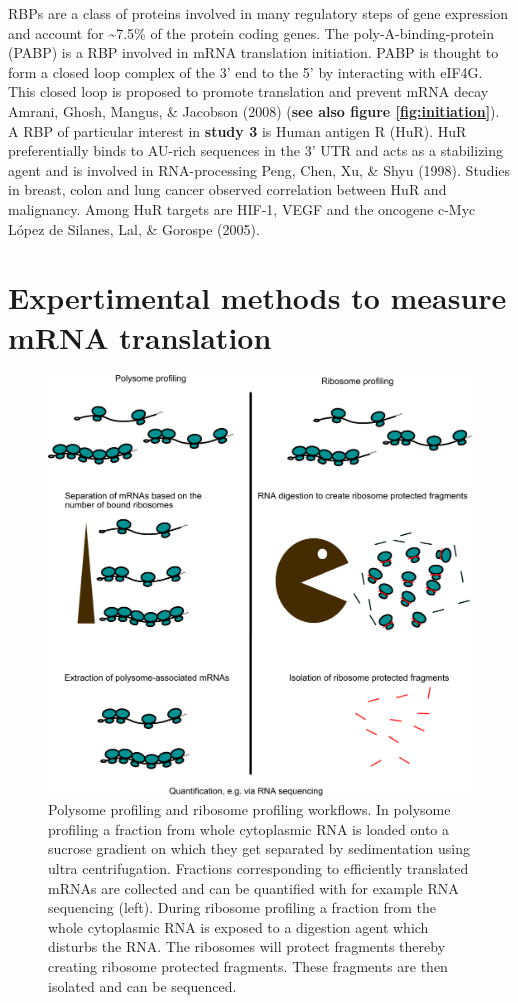 \documentclass[
  12pt,
  openany]{book}
\begin{document}
RBPs are a class of proteins involved in many regulatory steps of gene expression and account for \textasciitilde7.5\% of the protein coding genes. The poly-A-binding-protein (PABP) is a RBP involved in mRNA translation initiation. PABP is thought to form a closed loop complex of the 3' end to the 5' by interacting with eIF4G. This closed loop is proposed to promote translation and prevent mRNA decay Amrani, Ghosh, Mangus, \& Jacobson (2008) (\textbf{see also figure \ref{fig:initiation}}). A RBP of particular interest in \textbf{study 3} is Human antigen R (HuR). HuR preferentially binds to AU-rich sequences in the 3' UTR and acts as a stabilizing agent and is involved in RNA-processing Peng, Chen, Xu, \& Shyu (1998). Studies in breast, colon and lung cancer observed correlation between HuR and malignancy. Among HuR targets are HIF-1, VEGF and the oncogene c-Myc López de Silanes, Lal, \& Gorospe (2005).
\newline

\section{Expertimental methods to measure mRNA translation} \label{exptMethod}
\begin{figure}
    \includegraphics{./figures/polyRibo.pdf}
  \caption{Polysome profiling and ribosome profiling workflows. In polysome profiling a fraction from whole cytoplasmic RNA is loaded onto a sucrose gradient on which they get separated by sedimentation using ultra centrifugation. Fractions corresponding to efficiently translated mRNAs are collected and can be quantified with for example RNA sequencing (left). During ribosome profiling a fraction from the whole cytoplasmic RNA is exposed to a digestion agent which disturbs the RNA. The ribosomes will protect fragments thereby creating ribosome protected fragments. These fragments are then isolated and can be sequenced.  \label{fig:polyRibo}}
\end{figure}
\end{document}
